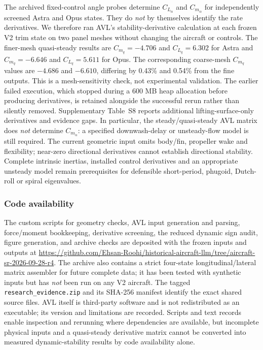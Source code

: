 \documentclass[10pt,letterpaper]{article}
\begin{document}
The archived fixed-control angle probes determine $C_{L_\alpha}$ and $C_{m_\alpha}$ for independently screened Astra and Opus states. They do \emph{not} by themselves identify the rate derivatives. We therefore ran AVL's stability-derivative calculation at each frozen V2 trim state on two panel meshes without changing the aircraft or controls. The finer-mesh quasi-steady results are $C_{m_q}=-4.706$ and $C_{L_q}=6.302$ for Astra and $C_{m_q}=-6.646$ and $C_{L_q}=5.611$ for Opus. The corresponding coarse-mesh $C_{m_q}$ values are $-4.686$ and $-6.610$, differing by 0.43\% and 0.54\% from the fine outputs. This is a mesh-sensitivity check, not experimental validation. The earlier failed execution, which stopped during a 600 MB heap allocation before producing derivatives, is retained alongside the successful rerun rather than silently removed. Supplementary Table~S8 reports additional lifting-surface-only derivatives and evidence gaps. In particular, the steady/quasi-steady AVL matrix does \emph{not} determine $C_{m_{\dot\alpha}}$: a specified downwash-delay or unsteady-flow model is still required. The current geometric input omits body/fin, propeller wake and flexibility; near-zero directional derivatives cannot establish directional stability. Complete intrinsic inertias, installed control derivatives and an appropriate unsteady model remain prerequisites for defensible short-period, phugoid, Dutch-roll or spiral eigenvalues.

\subsubsection{Code availability}
The custom scripts for geometry checks, AVL input generation and parsing, force/moment bookkeeping, derivative screening, the reduced dynamic sign audit, figure generation, and archive checks are deposited with the frozen inputs and outputs at \url{https://github.com/Ehsan-Roohi/historical-aircraft-llm/tree/aircraft-sr-2026-09-28-r4}. The archive also contains a strict four-state longitudinal/lateral matrix assembler for future complete data; it has been tested with synthetic inputs but has \emph{not} been run on any V2 aircraft. The tagged \texttt{research\_evidence.zip} and its SHA-256 manifest identify the exact shared source files. AVL itself is third-party software and is not redistributed as an executable; its version and limitations are recorded. Scripts and text records enable inspection and rerunning where dependencies are available, but incomplete physical inputs and a quasi-steady derivative matrix cannot be converted into measured dynamic-stability results by code availability alone.
\end{document}
